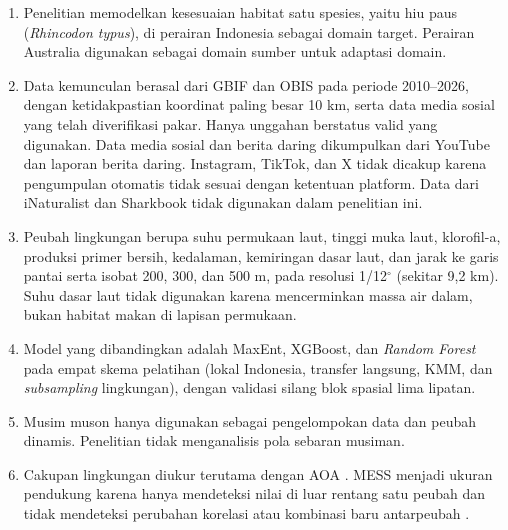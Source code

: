 \begin{enumerate}
    \item Penelitian memodelkan kesesuaian habitat satu spesies, yaitu hiu paus
    (\textit{Rhincodon typus}), di perairan Indonesia sebagai domain target.
    Perairan Australia digunakan sebagai domain sumber untuk adaptasi domain.
    \item Data kemunculan berasal dari GBIF dan OBIS pada periode 2010--2026,
    dengan ketidakpastian koordinat paling besar 10 km, serta data media sosial
    yang telah diverifikasi pakar. Hanya unggahan berstatus valid yang
    digunakan. Data media sosial dan berita daring dikumpulkan dari YouTube dan
    laporan berita daring. Instagram, TikTok, dan X tidak dicakup karena
    pengumpulan otomatis tidak sesuai dengan ketentuan platform. Data dari
    iNaturalist dan Sharkbook tidak digunakan dalam penelitian ini.
    \item Peubah lingkungan berupa suhu permukaan laut, tinggi muka laut,
    klorofil-a, produksi primer bersih, kedalaman, kemiringan dasar laut, dan
    jarak ke garis pantai serta isobat 200, 300, dan 500 m, pada resolusi
    1/12$^{\circ}$ (sekitar 9,2 km). Suhu dasar laut tidak digunakan karena
    mencerminkan massa air dalam, bukan habitat makan di lapisan permukaan.
    \item Model yang dibandingkan adalah MaxEnt, XGBoost, dan
    \textit{Random Forest} pada empat skema pelatihan (lokal Indonesia,
    transfer langsung, KMM, dan \textit{subsampling} lingkungan), dengan
    validasi silang blok spasial lima lipatan.
    \item Musim muson hanya digunakan sebagai pengelompokan data dan peubah
    dinamis. Penelitian tidak menganalisis pola sebaran musiman.
    \item Cakupan lingkungan diukur terutama dengan AOA
    \citep{MeyerPebesma2021}. MESS menjadi ukuran pendukung karena hanya
    mendeteksi nilai di luar rentang satu peubah dan tidak mendeteksi
    perubahan korelasi atau kombinasi baru antarpeubah \citep{Elith2010}.
\end{enumerate}

